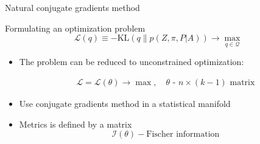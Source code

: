 \documentclass{beamer}
\theoremstyle{definition}
\theoremstyle{plain}
\theoremstyle{remark}
\begin{document}
			\begin{frame}{Natural conjugate gradients method} %
				\begin{block}{Formulating an optimization problem}
                    \begin{equation*}
                        \mathcal L(q) \equiv -\text{KL}\left(q \| p(Z, \pi, P | A)\right) \longrightarrow \max\limits_{q \in \mathcal Q}
                    \end{equation*}
				\end{block}
                \begin{itemize}
				    \item The problem can be reduced to unconstrained optimization:

                        \begin{equation}
                            \begin{aligned}
                            \nonumber
                            \mathcal L = \mathcal L(\theta) \longrightarrow \max, \quad \text{$\theta$ - $n\times(k-1)$ matrix}
                            \end{aligned}
                        \end{equation}

                    \item Use conjugate gradients method in a statistical manifold
                    \item Metrics is defined by a matrix
                        \[
                            \mathcal I(\theta) - \text{Fischer information}
                        \]
                \end{itemize}
			\end{frame}
\end{document}
